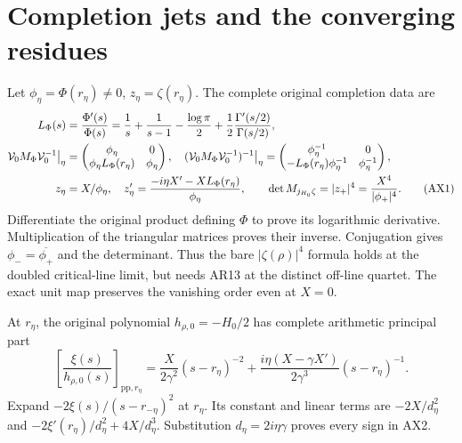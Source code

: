 \documentclass[11pt]{article}
\begin{document}
\section{Completion jets and the converging residues}
Let $\phi_\eta=\Phi(r_\eta)\ne0$, $z_\eta=\zeta(r_\eta)$.
The complete original completion data are
\begin{align}
L_\Phi(s)&=\frac{\Phi'(s)}{\Phi(s)}
=\frac1s+\frac1{s-1}-\frac{\log\pi}{2}
                  +\frac12\frac{\Gamma'(s/2)}{\Gamma(s/2)},\nonumber\\
{\cal V}_0M_\Phi{\cal V}_0^{-1}\big|_\eta
&=\begin{pmatrix}\phi_\eta&0\\\phi_\eta L_\Phi(r_\eta)&\phi_\eta\end{pmatrix},
\quad
({\cal V}_0M_\Phi{\cal V}_0^{-1})^{-1}\big|_\eta
=\begin{pmatrix}\phi_\eta^{-1}&0\\
-L_\Phi(r_\eta)\phi_\eta^{-1}&\phi_\eta^{-1}\end{pmatrix},\nonumber\\
z_\eta&=X/\phi_\eta,\quad
z_\eta'=\frac{-i\eta X'-XL_\Phi(r_\eta)}{\phi_\eta},\qquad
\det M_{j_{H_0}\zeta}=|z_+|^4=\frac{X^4}{|\phi_+|^4}.
\tag{AX1}
\end{align}
Differentiate the original product defining $\Phi$ to prove its
logarithmic derivative. Multiplication of the triangular matrices
proves their inverse. Conjugation gives
$\phi_-=\overline{\phi_+}$ and the determinant. Thus the bare
$|\zeta(\rho)|^4$ formula holds at the doubled critical-line
limit, but needs AR13 at the distinct off-line quartet.
The exact unit map preserves the vanishing order even at $X=0$.

At $r_\eta$, the original polynomial $h_{\rho,0}=-H_0/2$
has complete arithmetic principal part
\begin{equation}
\left[\frac{\xi(s)}{h_{\rho,0}(s)}\right]_{\mathrm{pp},r_\eta}
=\frac{X}{2\gamma^2}(s-r_\eta)^{-2}
+\frac{i\eta(X-\gamma X')}{2\gamma^3}(s-r_\eta)^{-1}.
\tag{AX2}
\end{equation}
Expand $-2\xi(s)/(s-r_{-\eta})^2$ at $r_\eta$.
Its constant and linear terms are
$-2X/d_\eta^2$ and
$-2\xi'(r_\eta)/d_\eta^2+4X/d_\eta^3$.
Substitution $d_\eta=2i\eta\gamma$ proves every sign in AX2.
\end{document}
